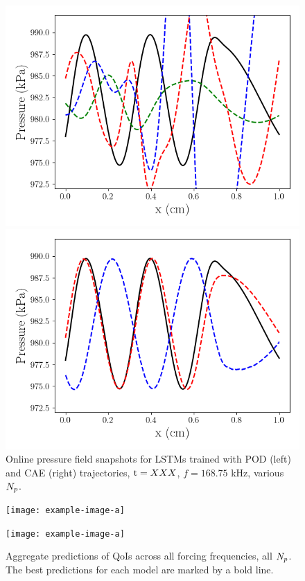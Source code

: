 \begin{figure}
    \begin{minipage}{0.49\linewidth}
        \includegraphics[width=0.99\linewidth]{Chapters/TransientFlame/Images/lstm/pod_rom_press_snaps.png}
    \end{minipage}
    \begin{minipage}{0.49\linewidth}
        \includegraphics[width=0.99\linewidth]{Chapters/TransientFlame/Images/lstm/cae_rom_press_snaps.png}
    \end{minipage}
    \caption{Online pressure field snapshots for LSTMs trained with POD (left) and CAE (right) trajectories, $\text{t} = XXX$, $f = 168.75$ kHz, various $N_p$.}
\end{figure}

\begin{figure}
    \begin{minipage}{0.49\linewidth}
        \texttt{[image: example-image-a]}
    \end{minipage}
    \begin{minipage}{0.49\linewidth}
        \texttt{[image: example-image-a]}
    \end{minipage}
    \caption{Aggregate predictions of QoIs across all forcing frequencies, all $N_p$. The best predictions for each model are marked by a bold line.}
\end{figure}